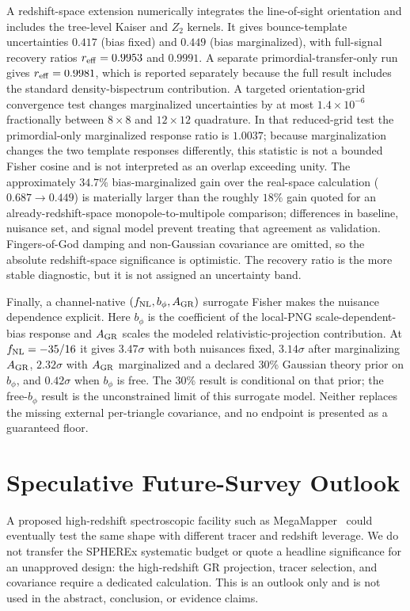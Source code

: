 \documentclass[aps,prd,twocolumn,superscriptaddress,showpacs,preprintnumbers,nofootinbib,longbibliography,floatfix]{revtex4-2}
\newcommand{\fnl}{f_{\rm NL}}
\begin{document}
A redshift-space extension numerically integrates the line-of-sight orientation and includes the tree-level Kaiser and $Z_2$ kernels. It gives bounce-template uncertainties $0.417$ (bias fixed) and $0.449$ (bias marginalized), with full-signal recovery ratios $r_{\rm eff}=0.9953$ and $0.9991$. A separate primordial-transfer-only run gives $r_{\rm eff}=0.9981$, which is reported separately because the full result includes the standard density-bispectrum contribution. A targeted orientation-grid convergence test changes marginalized uncertainties by at most $1.4\times10^{-6}$ fractionally between $8\times8$ and $12\times12$ quadrature. In that reduced-grid test the primordial-only marginalized response ratio is $1.0037$; because marginalization changes the two template responses differently, this statistic is not a bounded Fisher cosine and is not interpreted as an overlap exceeding unity. The approximately $34.7\%$ bias-marginalized gain over the real-space calculation ($0.687\to0.449$) is materially larger than the roughly $18\%$ gain quoted for an already-redshift-space monopole-to-multipole comparison; differences in baseline, nuisance set, and signal model prevent treating that agreement as validation. Fingers-of-God damping and non-Gaussian covariance are omitted, so the absolute redshift-space significance is optimistic. The recovery ratio is the more stable diagnostic, but it is not assigned an uncertainty band.

Finally, a channel-native $(\fnl,b_\phi,A_{\rm GR})$ surrogate Fisher makes the nuisance dependence explicit. Here $b_\phi$ is the coefficient of the local-PNG scale-dependent-bias response and $A_{\rm GR}$ scales the modeled relativistic-projection contribution. At $\fnl=-35/16$ it gives $3.47\sigma$ with both nuisances fixed, $3.14\sigma$ after marginalizing $A_{\rm GR}$, $2.32\sigma$ with $A_{\rm GR}$ marginalized and a declared 30\% Gaussian theory prior on $b_\phi$, and $0.42\sigma$ when $b_\phi$ is free. The 30\% result is conditional on that prior; the free-$b_\phi$ result is the unconstrained limit of this surrogate model. Neither replaces the missing external per-triangle covariance, and no endpoint is presented as a guaranteed floor.
\section{Speculative Future-Survey Outlook}
\label{sec:megamapper}

A proposed high-redshift spectroscopic facility such as MegaMapper~\cite{Schlegel:2022} could eventually test the same shape with different tracer and redshift leverage. We do not transfer the SPHEREx systematic budget or quote a headline significance for an unapproved design: the high-redshift GR projection, tracer selection, and covariance require a dedicated calculation. This is an outlook only and is not used in the abstract, conclusion, or evidence claims.
\end{document}
